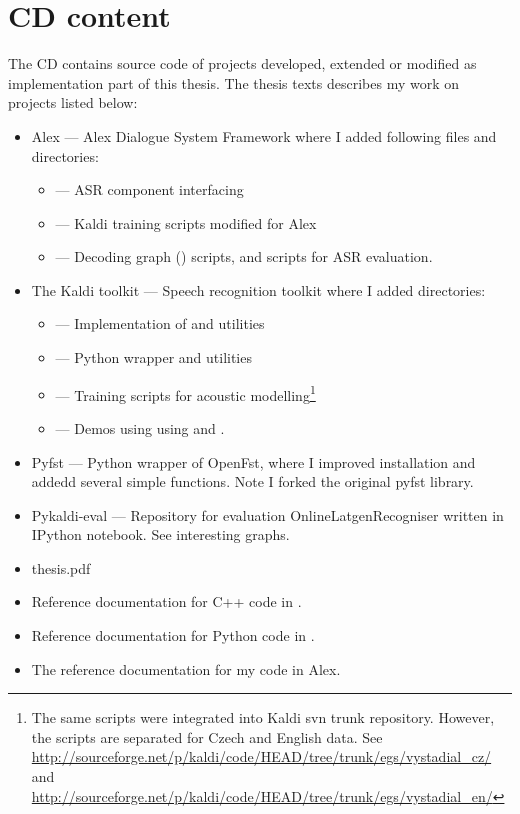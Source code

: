 \chapter{CD content}
\label{cha:cd_content}
The CD contains source code of projects developed, extended or modified as implementation part of this thesis.
The thesis texts describes my work on projects listed below:

\begin{itemize}
    \item Alex --- Alex Dialogue System Framework where I added following files and directories:
        \begin{itemize}
            \item {} --- ASR component interfacing 
            \item {} --- Kaldi training scripts modified for Alex 
            \item {} --- Decoding graph () scripts, and scripts for \acs{ASR} evaluation.
        \end{itemize}
    \item The Kaldi toolkit --- Speech recognition toolkit where I added directories:
        \begin{itemize}
            \item {} --- Implementation of  and utilities 
            \item {} --- Python wrapper  and utilities
            \item {} --- Training scripts for acoustic modelling\footnote{The same scripts were integrated into Kaldi svn trunk repository. However, the scripts are separated for Czech and English data. See \url{http://sourceforge.net/p/kaldi/code/HEAD/tree/trunk/egs/vystadial_cz/} and \url{http://sourceforge.net/p/kaldi/code/HEAD/tree/trunk/egs/vystadial_en/}}
            \item {} --- Demos using using  and .
        \end{itemize} 
    \item Pyfst --- Python wrapper of OpenFst, where I improved installation and addedd several simple functions. Note I forked the original pyfst library.
    \item Pykaldi-eval --- Repository for evaluation OnlineLatgenRecogniser written in IPython notebook. See interesting graphs.
    \item thesis.pdf
    \item Reference documentation for C++ code in .
    \item Reference documentation for Python code in .
    \item The reference documentation for my code in Alex.
\end{itemize}
